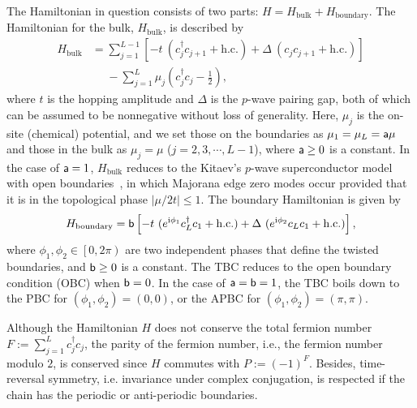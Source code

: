 \documentclass[aps, prb, showpacs, twocolumn, %
amssymb,superscriptaddress]{revtex4}
\def\dag{\dagger}
\newcommand{\ii}{\text{i}}
\begin{document}
The Hamiltonian in question consists of two parts: $H = H_{\mathrm{bulk}} + H_{\mathrm{boundary}}$. The Hamiltonian for the bulk, $H_{\mathrm{bulk}}$, is described by
\begin{align}
H_{\mathrm{bulk}}
&= \sum^{L-1}_{j=1}
      \left[ -t~(c^{\dagger}_{j} c_{j+1}+ \mathrm{h.c.} )
      +\Delta~( c_{j} c_{j+1} + \mathrm{h.c.} ) \right] \nonumber\\
&~~~~~~- \sum^{L}_{j=1} \mu_{j} \left( c_{j}^{\dag} c_{j} - \frac{1}{2} \right) ,
      \label{eq:Ham1Bulk}
\end{align}
where $t$ is the hopping amplitude and $\Delta$ is the $p$-wave pairing gap, both of which can be assumed to be nonnegative without loss of generality. Here, $\mu_{j}$ is the on-site (chemical) potential, and we set those on the boundaries as $\mu_{1}=\mu_{L}={\sf a} \mu$ and those in the bulk as $\mu_{j}=\mu$ ($j=2,3,\cdots,L-1$), where ${\sf a} \ge 0$ is a constant. In the case of ${\sf a}=1$, $H_{\mathrm{bulk}}$ reduces to the Kitaev's $p$-wave superconductor model with open boundaries~\cite{Kitaev01}, in which Majorana edge zero modes occur provided that it is in the topological phase $\left| \mu/2t \right| \leq 1$. The boundary Hamiltonian is given by
\begin{equation}
H_{\mathrm{boundary}}
= {\sf b} \left[ -t~( e^{\ii \phi_{1}} c_{L}^{\dag} c_{1} + \mathrm{h.c.} )
+ \Delta~( e^{\ii \phi_{2}} c_{L} c_{1} + \mathrm{h.c.} ) \right],
\label{eq:Ham1Boundary}
\end{equation}
where $\phi_{1},\phi_{2} \in \left[ 0, 2\pi \right)$ are two independent phases that define the twisted boundaries, and ${\sf b} \ge 0$ is a constant. The TBC reduces to the open boundary condition (OBC) when ${\sf b}=0$. In the case of ${\sf a}={\sf b}=1$, the TBC boils down to the PBC for $\left( \phi_{1},\phi_{2} \right) = (0,0)$, or the APBC for $\left( \phi_{1},\phi_{2} \right) = (\pi,\pi)$.

Although the Hamiltonian $H$ does not conserve the total fermion number $F:= \sum_{j=1}^{L} c_{j}^{\dag} c_{j}$, the parity of the fermion number, i.e., the fermion number modulo $2$, is conserved since $H$ commutes with $P := (-1)^{F}$. Besides, time-reversal symmetry, i.e. invariance under complex conjugation, is respected if the chain has the periodic or anti-periodic boundaries.
\end{document}
